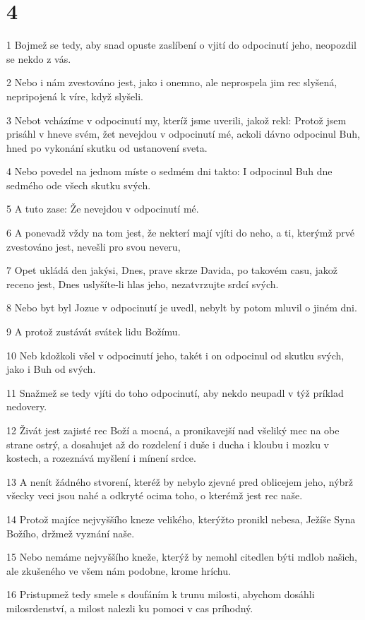 \chapter{4}

\par 1 Bojmež se tedy, aby snad opuste zaslíbení o vjití do odpocinutí jeho, neopozdil se nekdo z vás.
\par 2 Nebo i nám zvestováno jest, jako i onemno, ale neprospela jim rec slyšená, nepripojená k víre, když slyšeli.
\par 3 Nebot vcházíme v odpocinutí my, kteríž jsme uverili, jakož rekl: Protož jsem prisáhl v hneve svém, žet nevejdou v odpocinutí mé, ackoli dávno odpocinul Buh, hned po vykonání skutku od ustanovení sveta.
\par 4 Nebo povedel na jednom míste o sedmém dni takto: I odpocinul Buh dne sedmého ode všech skutku svých.
\par 5 A tuto zase: Že nevejdou v odpocinutí mé.
\par 6 A ponevadž vždy na tom jest, že nekterí mají vjíti do neho, a ti, kterýmž prvé zvestováno jest, nevešli pro svou neveru,
\par 7 Opet ukládá den jakýsi, Dnes, prave skrze Davida, po takovém casu, jakož receno jest, Dnes uslyšíte-li hlas jeho, nezatvrzujte srdcí svých.
\par 8 Nebo byt byl Jozue v odpocinutí je uvedl, nebylt by potom mluvil o jiném dni.
\par 9 A protož zustávát svátek lidu Božímu.
\par 10 Neb kdožkoli všel v odpocinutí jeho, takét i on odpocinul od skutku svých, jako i Buh od svých.
\par 11 Snažmež se tedy vjíti do toho odpocinutí, aby nekdo neupadl v týž príklad nedovery.
\par 12 Živát jest zajisté rec Boží a mocná, a pronikavejší nad všeliký mec na obe strane ostrý, a dosahujet až do rozdelení i duše i ducha i kloubu i mozku v kostech, a rozeznává myšlení i mínení srdce.
\par 13 A nenít žádného stvorení, kteréž by nebylo zjevné pred oblicejem jeho, nýbrž všecky veci jsou nahé a odkryté ocima toho, o kterémž jest rec naše.
\par 14 Protož majíce nejvyššího kneze velikého, kterýžto pronikl nebesa, Ježíše Syna Božího, držmež vyznání naše.
\par 15 Nebo nemáme nejvyššího kneže, kterýž by nemohl citedlen býti mdlob našich, ale zkušeného ve všem nám podobne, krome hríchu.
\par 16 Pristupmež tedy smele s doufáním k trunu milosti, abychom dosáhli milosrdenství, a milost nalezli ku pomoci v cas príhodný.

